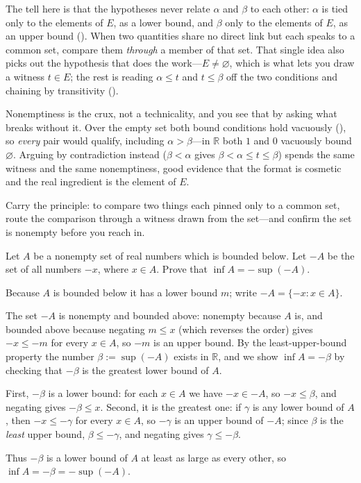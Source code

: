 \documentclass[main.tex]{subfiles}
\begin{document}
\begin{Reflection}
The tell here is that the hypotheses never relate $\alpha$ and $\beta$ to each other: $\alpha$ is tied
only to the elements of $E$, as a lower bound, and $\beta$ only to the elements of $E$, as an upper
bound (). When two quantities share no direct link but each speaks to a common set,
compare them \emph{through} a member of that set. That single idea also picks out the hypothesis that
does the work---$E\neq\varnothing$, which is what lets you draw a witness $t\in E$; the rest is reading
$\alpha\le t$ and $t\le\beta$ off the two conditions and chaining by transitivity ().

Nonemptiness is the crux, not a technicality, and you see that by asking what breaks without it. Over
the empty set both bound conditions hold vacuously (), so \emph{every} pair would qualify,
including $\alpha>\beta$---in $\mathbb R$ both $1$ and $0$ vacuously bound $\varnothing$. Arguing by
contradiction instead ($\beta<\alpha$ gives $\beta<\alpha\le t\le\beta$) spends the same witness and
the same nonemptiness, good evidence that the format is cosmetic and the real ingredient is the element
of $E$.

Carry the principle: to compare two things each pinned only to a common set, route the comparison
through a witness drawn from the set---and confirm the set is nonempty before you reach in.
\end{Reflection}

Let $A$ be a nonempty set of real numbers which is bounded below. Let $-A$ be the set of all numbers
$-x$, where $x\in A$. Prove that $\inf A=-\sup(-A)$.

\begin{Solution}
Because $A$ is bounded below it has a lower bound $m$; write $-A=\{-x:x\in A\}$.

The set $-A$ is nonempty and bounded above: nonempty because $A$ is, and bounded above because
negating $m\le x$ (which reverses the order) gives $-x\le -m$ for every $x\in A$, so $-m$ is an upper
bound. By the least-upper-bound property the number $\beta:=\sup(-A)$ exists in $\mathbb R$, and we
show $\inf A=-\beta$ by checking that $-\beta$ is the greatest lower bound of $A$.

First, $-\beta$ is a lower bound: for each $x\in A$ we have $-x\in -A$, so $-x\le\beta$, and negating
gives $-\beta\le x$. Second, it is the greatest one: if $\gamma$ is any lower bound of $A$, then
$-x\le-\gamma$ for every $x\in A$, so $-\gamma$ is an upper bound of $-A$; since $\beta$ is the
\emph{least} upper bound, $\beta\le-\gamma$, and negating gives $\gamma\le-\beta$.

Thus $-\beta$ is a lower bound of $A$ at least as large as every other, so $\inf A=-\beta=-\sup(-A)$.
\end{Solution}
\end{document}
